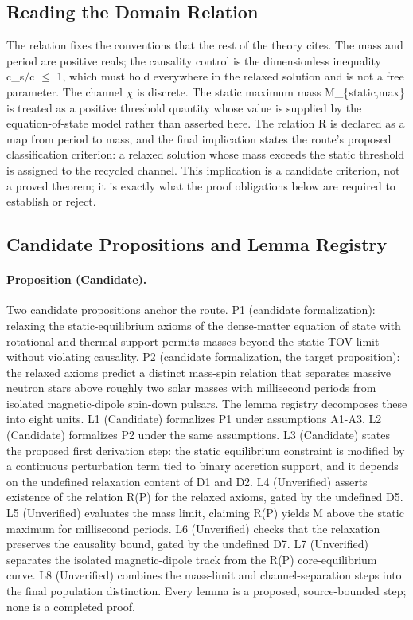 \documentclass[conference]{IEEEtran}
\begin{document}
\subsection{Reading the Domain Relation}
The relation fixes the conventions that the rest of the theory cites. The mass and period are positive reals; the causality control is the dimensionless inequality c\_s/c $\leq$ 1, which must hold everywhere in the relaxed solution and is not a free parameter. The channel $\chi$ is discrete. The static maximum mass M\_\{static,max\} is treated as a positive threshold quantity whose value is supplied by the equation-of-state model rather than asserted here. The relation R is declared as a map from period to mass, and the final implication states the route's proposed classification criterion: a relaxed solution whose mass exceeds the static threshold is assigned to the recycled channel. This implication is a candidate criterion, not a proved theorem; it is exactly what the proof obligations below are required to establish or reject.

\subsection{Candidate Propositions and Lemma Registry}
\paragraph{Proposition (Candidate).} Two candidate propositions anchor the route. P1 (candidate formalization): relaxing the static-equilibrium axioms of the dense-matter equation of state with rotational and thermal support permits masses beyond the static TOV limit without violating causality. P2 (candidate formalization, the target proposition): the relaxed axioms predict a distinct mass-spin relation that separates massive neutron stars above roughly two solar masses with millisecond periods from isolated magnetic-dipole spin-down pulsars. The lemma registry decomposes these into eight units. L1 (Candidate) formalizes P1 under assumptions A1-A3. L2 (Candidate) formalizes P2 under the same assumptions. L3 (Candidate) states the proposed first derivation step: the static equilibrium constraint is modified by a continuous perturbation term tied to binary accretion support, and it depends on the undefined relaxation content of D1 and D2. L4 (Unverified) asserts existence of the relation R(P) for the relaxed axioms, gated by the undefined D5. L5 (Unverified) evaluates the mass limit, claiming R(P) yields M above the static maximum for millisecond periods. L6 (Unverified) checks that the relaxation preserves the causality bound, gated by the undefined D7. L7 (Unverified) separates the isolated magnetic-dipole track from the R(P) core-equilibrium curve. L8 (Unverified) combines the mass-limit and channel-separation steps into the final population distinction. Every lemma is a proposed, source-bounded step; none is a completed proof.
\end{document}
